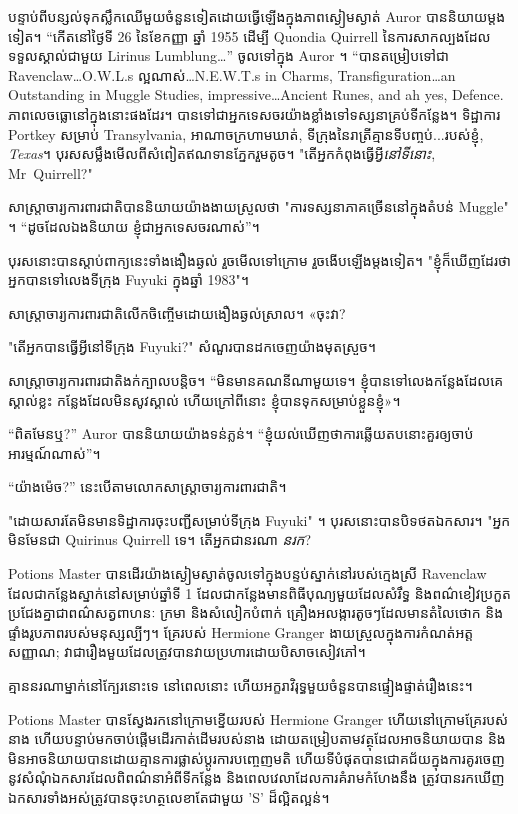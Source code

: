 {{{បន្ទាប់​ពី​បន្សល់​ទុក​ស្លឹក​ឈើ​មួយ​ចំនួន​ទៀត​ដោយ​ធ្វើ​ឡើង​ក្នុង​ភាព​ស្ងៀម​ស្ងាត់ Auror បាន​និយាយ​ម្ដង​ទៀត។ “កើតនៅថ្ងៃទី 26 នៃខែកញ្ញា ឆ្នាំ 1955 ដើម្បី Quondia Quirrell នៃការសាកល្បងដែលទទួលស្គាល់ជាមួយ Lirinus Lumblung…” ចូលទៅក្នុង Auror ។ “បានតម្រៀបទៅជា Ravenclaw…O.W.L.s ល្អណាស់…N.E.W.T.s in Charms, Transfiguration…an Outstanding in Muggle Studies, impressive…Ancient Runes, and ah yes, Defence. ភាពលេចធ្លោនៅក្នុងនោះផងដែរ។ បាន​ទៅ​ជា​អ្នក​ទេសចរ​យ៉ាង​ខ្លាំង​ទៅ​ទស្សនា​គ្រប់​ទីកន្លែង។ ទិដ្ឋាការ Portkey សម្រាប់ Transylvania, អាណាចក្រហាមឃាត់, ទីក្រុងនៃរាត្រីគ្មានទីបញ្ចប់...របស់ខ្ញុំ, \emph{Texas}។ បុរស​សម្លឹង​មើល​ពី​សំពៀត​ឥណទាន​ភ្នែក​រួម​តូច។ "តើអ្នកកំពុងធ្វើអ្វី\emph{នៅទីនោះ}, Mr~Quirrell?"

សាស្ត្រាចារ្យការពារជាតិបាននិយាយយ៉ាងងាយស្រួលថា "ការទស្សនាភាគច្រើននៅក្នុងតំបន់ Muggle" ។ “ដូច​ដែល​ឯង​និយាយ ខ្ញុំ​ជា​អ្នក​ទេសចរ​ណាស់”។

បុរស​នោះ​បាន​ស្ដាប់​ពាក្យ​នេះ​ទាំង​ងឿង​ឆ្ងល់ រួច​មើល​ទៅ​ក្រោម រួច​ងើប​ឡើង​ម្ដង​ទៀត។ "ខ្ញុំក៏ឃើញដែរថាអ្នកបានទៅលេងទីក្រុង Fuyuki ក្នុងឆ្នាំ 1983"។

សាស្ត្រាចារ្យ​ការពារ​ជាតិ​លើក​ចិញ្ចើម​ដោយ​ងឿង​ឆ្ងល់​ស្រាល។ «ចុះវា?

"តើអ្នកបានធ្វើអ្វីនៅទីក្រុង Fuyuki?" សំណួរ​បាន​ដក​ចេញ​យ៉ាង​មុត​ស្រួច។

សាស្ត្រាចារ្យ​ការពារ​ជាតិ​ងក់​ក្បាល​បន្តិច។ “មិនមានគណនីណាមួយទេ។ ខ្ញុំ​បាន​ទៅ​លេង​កន្លែង​ដែល​គេ​ស្គាល់​ខ្លះ កន្លែង​ដែល​មិន​សូវ​ស្គាល់ ហើយ​ក្រៅ​ពី​នោះ ខ្ញុំ​បាន​ទុក​សម្រាប់​ខ្លួន​ខ្ញុំ»។

“ពិតមែនឬ?” Auror បាននិយាយយ៉ាងទន់ភ្លន់។ “ខ្ញុំ​យល់​ឃើញ​ថា​ការ​ឆ្លើយ​តប​នោះ​គួរ​ឲ្យ​ចាប់​អារម្មណ៍​ណាស់”។

“យ៉ាងម៉េច?” នេះ​បើ​តាម​លោក​សាស្ត្រាចារ្យ​ការពារ​ជាតិ។

"ដោយសារតែមិនមានទិដ្ឋាការចុះបញ្ជីសម្រាប់ទីក្រុង Fuyuki" ។ បុរស​នោះ​បាន​បិទ​ថត​ឯកសារ។ "អ្នកមិនមែនជា Quirinus Quirrell ទេ។ តើអ្នកជានរណា \emph{នរក}?

\later

Potions Master បានដើរយ៉ាងស្ងៀមស្ងាត់ចូលទៅក្នុងបន្ទប់ស្នាក់នៅរបស់ក្មេងស្រី Ravenclaw ដែលជាកន្លែងស្នាក់នៅសម្រាប់ឆ្នាំទី 1 ដែលជាកន្លែងមានពិធីបុណ្យមួយដែលសំរឹទ្ធ និងពណ៌ខៀវប្រកួតប្រជែងគ្នាជាពណ៌សត្វពាហនៈ ក្រមា និងសំលៀកបំពាក់ គ្រឿងអលង្ការតូចៗដែលមានតំលៃថោក និងផ្ទាំងរូបភាពរបស់មនុស្សល្បីៗ។ គ្រែរបស់ Hermione Granger ងាយស្រួលក្នុងការកំណត់អត្តសញ្ញាណ; វាជារឿងមួយដែលត្រូវបានវាយប្រហារដោយបិសាចសៀវភៅ។

គ្មាននរណាម្នាក់នៅក្បែរនោះទេ នៅពេលនោះ ហើយអក្ខរាវិរុទ្ធមួយចំនួនបានផ្ទៀងផ្ទាត់រឿងនេះ។

Potions Master បានស្វែងរកនៅក្រោមខ្នើយរបស់ Hermione Granger ហើយនៅក្រោមគ្រែរបស់នាង ហើយបន្ទាប់មកចាប់ផ្តើមដើរកាត់ដើមរបស់នាង ដោយតម្រៀបតាមវត្ថុដែលអាចនិយាយបាន និងមិនអាចនិយាយបានដោយគ្មានការផ្លាស់ប្តូរការបញ្ចេញមតិ ហើយទីបំផុតបានជោគជ័យក្នុងការគូរចេញនូវសំណុំឯកសារដែលពិពណ៌នាអំពីទីកន្លែង និងពេលវេលាដែលការគំរាមកំហែងនឹង ត្រូវ​បាន​រក​ឃើញ ឯកសារ​ទាំង​អស់​ត្រូវ​បាន​ចុះ​ហត្ថលេខា​តែ​ជាមួយ 'S' ដ៏​ល្អិត​ល្អន់។

}}}
